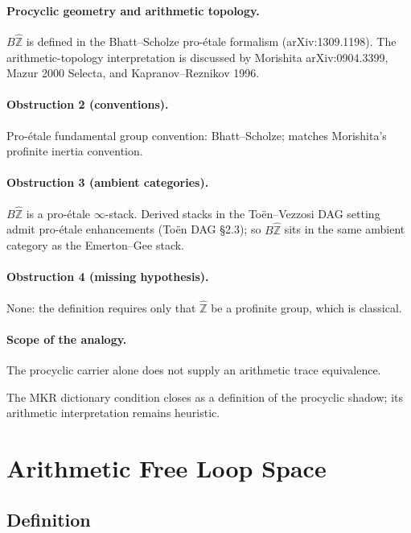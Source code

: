 \paragraph{Procyclic geometry and arithmetic topology.}
\(B\widehat{\mathbb Z}\) is defined in the Bhatt--Scholze
pro-\'etale formalism (arXiv:1309.1198). The arithmetic-topology
interpretation is discussed by Morishita arXiv:0904.3399,
Mazur 2000 Selecta, and Kapranov--Reznikov 1996.

\paragraph{Obstruction 2 (conventions).} Pro-\'etale fundamental group
convention: Bhatt--Scholze; matches Morishita's profinite inertia
convention.

\paragraph{Obstruction 3 (ambient categories).} \(B\widehat{\mathbb{Z}}\)
is a pro-\'etale \(\infty\)-stack. Derived stacks in the
To\"en--Vezzosi DAG setting admit pro-\'etale enhancements
(To\"en DAG \S2.3); so \(B\widehat{\mathbb{Z}}\) sits in
the same ambient category as the Emerton--Gee stack.

\paragraph{Obstruction 4 (missing hypothesis).} None: the definition
requires only that \(\widehat{\mathbb{Z}}\) be a profinite group,
which is classical.

\paragraph{Scope of the analogy.} The procyclic carrier alone does
not supply an arithmetic trace equivalence.

The MKR dictionary condition closes as a definition of the procyclic
shadow; its arithmetic interpretation remains heuristic.

\section{Arithmetic Free Loop Space}
\label{v4-arith:bzn:free-loop-space}

\subsection{Definition}

